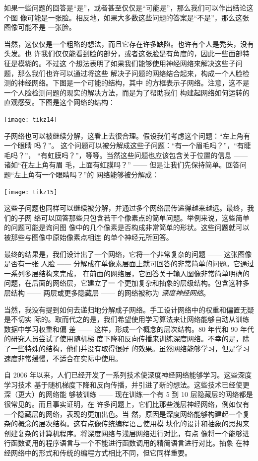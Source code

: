 如果一些问题的回答是“是”，或者甚至仅仅是“可能是”，那么我们可以作出结论这个图
像可能是一张脸。相反地，如果大多数这些问题的答案是“不是”，那么这张图像可能不是
一张脸。

当然，这仅仅是一个粗略的想法，而且它存在许多缺陷。也许有个人是秃头，没有头发。也
许我们仅仅能看到脸的部分，或者这张脸是有角度的，因此一些面部特征是模糊的。不过这
个想法表明了如果我们能够使用神经网络来解决这些子问题，那么我们也许可以通过将这些
解决子问题的网络结合起来，构成一个人脸检测的神经网络。下图是一个可能的结构，其中
的方框表示子网络。注意，这不是一个人脸检测问题的现实的解决方法，而是为了帮助我们
构建起网络如何运转的直观感受。下图是这个网络的结构：

\begin{center}
  \texttt{[image: tikz14]}
\end{center}

子网络也可以被继续分解，这看上去很合理。假设我们考虑这个问题：“左上角有一个眼睛
吗？”。 这个问题可以被分解成这些子问题：“有一个眉毛吗？”，“有睫毛吗？”，
“有虹膜吗？”，等等。当然这些问题也应该包含关于位置的信息 —— 诸如“在左上角有眉
毛，上面有虹膜吗？” —— 但是让我们先保持简单。回答问题“左上角有一个眼睛吗？”的
网络能够被分解成：

\begin{center}
  \texttt{[image: tikz15]}
\end{center}

这些子问题也同样可以继续被分解，并通过多个网络层传递得越来越远。最终，我们的子网
络可以回答那些只包含若干个像素点的简单问题。举例来说，这些简单的问题可能是询问图
像中的几个像素是否构成非常简单的形状。这些问题就可以被那些与图像中原始像素点相连
的单个神经元所回答。

最终的结果是，我们设计出了一个网络，它将一个非常复杂的问题 —— 这张图像是否有一张
人脸 —— 分解成在单像素层面上就可回答的非常简单的问题。它通过一系列多层结构来完成，
在前面的网络层，它回答关于输入图像非常简单明确的问题，在后面的网络层，它建立了一
个更加复杂和抽象的层级结构。包含这种多层结构 —— 两层或更多隐藏层 —— 的网络被称为%
\emph{深度神经网络}。

当然，我没有提到如何去递归地分解成子网络。手工设计网络中的权重和偏置无疑是不切实
际的。取而代之的是，我们希望使用学习算法来让网络能够自动从训练数据中学习权重和偏
差 —— 这样，形成一个概念的层次结构。80 年代和 90 年代的研究人员尝试了使用随机梯
度下降和反向传播来训练深度网络。不幸的是，除了一些特殊的结构，他们并没有取得很好
的效果。虽然网络能够学习，但是学习速度非常缓慢，不适合在实际中使用。

自 2006 年以来，人们已经开发了一系列技术使深度神经网络能够学习。这些深度学习技术
基于随机梯度下降和反向传播，并引进了新的想法。这些技术已经使更深（更大）的网络能
够被训练 —— 现在训练一个有 5 到 10 层隐藏层的网络都是很常见的。而且事实证明，在
许多问题上，它们比那些浅层神经网络，例如仅有一个隐藏层的网络，表现的更加出色。当
然，原因是深度网络能够构建起一个复杂的概念的层次结构。这有点像传统编程语言使用模
块化的设计和抽象的思想来创建复杂的计算机程序。将深度网络与浅层网络进行对比，有点
像将一个能够进行函数调用的程序语言与一个不能进行函数调用的精简语言进行对比。抽象
在神经网络中的形式和传统的编程方式相比不同，但它同样重要。
